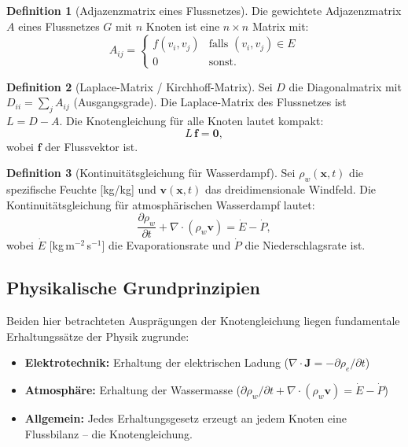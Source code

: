 ﻿\documentclass[a4paper,12pt]{article}
\theoremstyle{definition}
\newtheorem{definition}{Definition}
\begin{document}
\begin{definition}[Adjazenzmatrix eines Flussnetzes]
  Die gewichtete Adjazenzmatrix $A$ eines Flussnetzes $G$ mit $n$ Knoten ist
  eine $n \times n$ Matrix mit:
  \[
    A_{ij} = \begin{cases} f(v_i, v_j) & \text{falls } (v_i, v_j) \in E \\ 0 & \text{sonst.} \end{cases}
  \]
\end{definition}

\begin{definition}[Laplace-Matrix / Kirchhoff-Matrix]
  Sei $D$ die Diagonalmatrix mit $D_{ii} = \sum_j A_{ij}$ (Ausgangsgrade).
  Die Laplace-Matrix des Flussnetzes ist $L = D - A$. Die Knotengleichung
  für alle Knoten lautet kompakt:
  \[
    L \,\mathbf{f} = \mathbf{0},
  \]
  wobei $\mathbf{f}$ der Flussvektor ist.
\end{definition}

\begin{definition}[Kontinuitätsgleichung für Wasserdampf]
  Sei $\rho_w(\mathbf{x}, t)$ die spezifische Feuchte [kg/kg] und
  $\mathbf{v}(\mathbf{x}, t)$ das dreidimensionale Windfeld. Die
  Kontinuitätsgleichung für atmosphärischen Wasserdampf lautet:
  \[
    \frac{\partial \rho_w}{\partial t} + \nabla \cdot (\rho_w \mathbf{v})
    = \dot{E} - \dot{P},
  \]
  wobei $\dot{E}$ [kg\,m$^{-2}$\,s$^{-1}$] die Evaporationsrate und
  $\dot{P}$ die Niederschlagsrate ist.
\end{definition}

\subsection{Physikalische Grundprinzipien}

Beiden hier betrachteten Ausprägungen der Knotengleichung liegen
fundamentale Erhaltungssätze der Physik zugrunde:

\begin{itemize}
  \item \textbf{Elektrotechnik:} Erhaltung der elektrischen Ladung
    ($\nabla \cdot \mathbf{J} = -\partial\rho_e/\partial t$)
  \item \textbf{Atmosphäre:} Erhaltung der Wassermasse
    ($\partial\rho_w/\partial t + \nabla \cdot (\rho_w \mathbf{v}) = \dot{E} - \dot{P}$)
  \item \textbf{Allgemein:} Jedes Erhaltungsgesetz erzeugt an jedem Knoten
    eine Flussbilanz -- die Knotengleichung.
\end{itemize}
\end{document}
